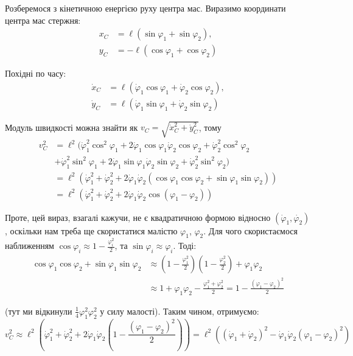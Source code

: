 \documentclass{hw_template}
\begin{document}
Розберемося з кінетичною енергією руху центра мас. Виразимо координати 
центра мас стержня:
\begin{align*}
    x_C &= \ell(\sin\varphi_1 + \sin\varphi_2), \\
    y_C &= -\ell(\cos\varphi_1 + \cos\varphi_2)
\end{align*}

Похідні по часу:
\begin{align*}
    \dot{x}_C &= \ell(\dot{\varphi}_1\cos\varphi_1 + \dot{\varphi}_2\cos\varphi_2), \\
    \dot{y}_C &= \ell(\dot{\varphi}_1\sin\varphi_1 + \dot{\varphi}_2\sin\varphi_2)
\end{align*}

Модуль швидкості можна знайти як $v_C=\sqrt{\dot{x}_C^2+\dot{y}_C^2}$, тому
\begin{align*}
    v_C^2 &= \ell^2(\dot{\varphi}_1^2\cos^2\varphi_1 + 2\dot{\varphi}_1\cos\varphi_1\dot{\varphi}_2\cos\varphi_2 + \dot{\varphi}_2^2\cos^2\varphi_2
    \\&+ \dot{\varphi}_1^2\sin^2\varphi_1 + 2\dot{\varphi}_1\sin\varphi_1\dot{\varphi}_2\sin\varphi_2 + \dot{\varphi}_2^2\sin^2\varphi_2) \\
    &= \ell^2(\dot{\varphi}_1^2 + \dot{\varphi}_2^2 + 2\dot{\varphi}_1\dot{\varphi}_2(\cos\varphi_1\cos\varphi_2 + \sin\varphi_1\sin\varphi_2)) \\
    &= \ell^2(\dot{\varphi}_1^2 + \dot{\varphi}_2^2 + 2\dot{\varphi}_1\dot{\varphi}_2\cos(\varphi_1 - \varphi_2))
\end{align*}

Проте, цей вираз, взагалі кажучи, не є квадратичною формою відносно
$(\dot{\varphi}_1,\dot{\varphi_2})$, оскільки нам треба ще скористатися малістю
$\varphi_1$, $\varphi_2$. Для чого скористаємося наближенням $\cos\varphi_i \approx 1-\frac{\varphi_i^2}{2}$,
та $\sin\varphi_i \approx \varphi_i$. Тоді:
\begin{align*}
    \cos\varphi_1\cos\varphi_2 + \sin\varphi_1\sin\varphi_2 &\approx \left(1-\frac{\varphi_1^2}{2}\right)\left(1-\frac{\varphi_2^2}{2}\right) + \varphi_1\varphi_2 \\
    &\approx 1 + \varphi_1\varphi_2 - \frac{\varphi_1^2+\varphi_2^2}{2} = 1 - \frac{(\varphi_1-\varphi_2)^2}{2}
\end{align*}

(тут ми відкинули $\frac{1}{4}\varphi_1^2\varphi_2^2$ у силу малості). Таким
чином, отримуємо:
\begin{equation*}
    v_C^2 \approx \ell^2\left(\dot{\varphi}_1^2 + \dot{\varphi}_2^2 + 2\dot{\varphi}_1\dot{\varphi}_2\left(1 - \frac{(\varphi_1-\varphi_2)^2}{2}\right)\right) = \ell^2((\dot{\varphi}_1+\dot{\varphi}_2)^2 - \dot{\varphi}_1\dot{\varphi}_2(\varphi_1-\varphi_2)^2)
\end{equation*}
\end{document}
